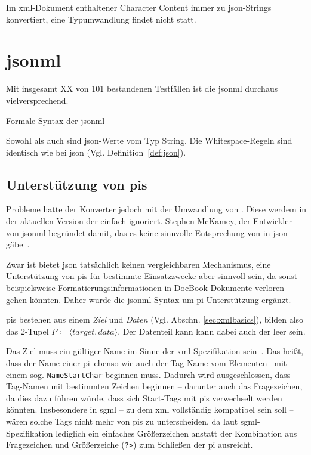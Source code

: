 Im \acrshort{xml}-Dokument enthaltener Character Content immer zu \acrshort{json}-Strings konvertiert, eine Typumwandlung findet nicht statt.

\chapter{\acrfull{jsonml}}
\label{chap:jsonml}

Mit insgesamt XX von 101 bestandenen Testfällen ist die \acrfull{jsonml} durchaus vielversprechend.

\begin{definition}Formale Syntax der \acrfull{jsonml}
\label{def:jsonml}

Sowohl  als auch  sind \acrshort{json}-Werte vom Typ String. Die Whitespace-Regeln sind identisch wie bei \acrshort{json} (Vgl. Definition~\ref{def:json}).

\begin{grammar}
    
\end{grammar}
\end{definition}

\section{Unterstützung von \glspl{pi}}

Probleme hatte der Konverter jedoch mit der Umwandlung von . Diese werdem in der aktuellen Version der einfach ignoriert. Stephen McKamey, der Entwickler von \acrshort{jsonml} begründet damit, das es keine sinnvolle Entsprechung von  in \acrshort{json} gäbe~\cite{mckamey2006xml}.

Zwar ist bietet \acrshort{json} tatsächlich keinen vergleichbaren Mechanismus, eine Unterstützung von \glspl{pi} für bestimmte Einsatzzwecke aber sinnvoll sein, da sonst beispielsweise Formatierungsinformationen in DocBook-Dokumente verloren gehen könnten. Daher wurde die \acrshort{jsonml}-Syntax um \acrshort{pi}-Unterstützung ergänzt.

\glspl{pi} bestehen aus einem \emph{Ziel} und \emph{Daten} (Vgl. Abschn. \ref{sec:xmlbasics}), bilden also das 2-Tupel $P \coloneqq \langle target, data \rangle$. Der Datenteil kann kann dabei auch der leer sein.

Das Ziel muss ein gültiger Name im Sinne der \acrshort{xml}-Spezifikation sein~\cite[{Regel~[17]}]{maler2008xml}. Das heißt, dass der Name einer \gls{pi}\ ebenso wie auch der Tag-Name vom Elementen~\cite[{Regel~[40]}]{maler2008xml} mit einem sog. \texttt{NameStartChar} beginnen muss. Dadurch wird ausgeschlossen, dass Tag-Namen mit bestimmten Zeichen beginnen -- darunter auch das Fragezeichen, da dies dazu führen würde, dass sich Start-Tags mit \glspl{pi} verwechselt werden könnten. Insbesondere in \acrshort{sgml} -- zu dem \acrshort{xml} vollständig kompatibel sein soll -- wären solche Tags nicht mehr von \glspl{pi} zu unterscheiden, da laut \acrshort{sgml}-Spezifikation lediglich ein einfaches Größerzeichen anstatt der Kombination aus Fragezeichen und Größerzeiche (\texttt{?>}) zum Schließen der \gls{pi} ausreicht.


